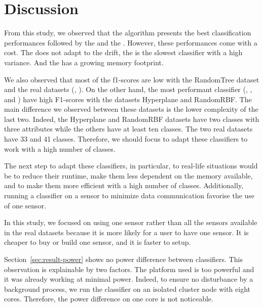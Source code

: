 \section{Discussion}
From this study, we observed that the \hoeffdingtree algorithm presents the
best classification performances followed by the \naivebayes and the
\mondrianforest.  However, these performances come with a cost.  The
\naivebayes does not adapt to the drift, the \mondrianforest is the slowest
classifier with a high variance. And the \hoeffdingtree has a growing memory
footprint.

We also observed that most of the f1-scores are low with the RandomTree dataset and
the real datasets (\banosdataset, \recofitdataset). On the other hand, the most
performant classifier (\mondrianforest, \hoeffdingtree, and \naivebayes) have high
F1-scores with the datasets Hyperplane and RandomRBF. The main difference we
observed between these datasets is the lower complexity of the last two.
Indeed, the Hyperplane and RandomRBF datasets have two classes with three
attributes while the others have at least ten classes. The two real datasets
have 33 and 41 classes. Therefore, we should focus to adapt these classifiers
to work with a high number of classes.

The next step to adapt these classifiers, \mondrianforest in particular, to real-life
situations would be to reduce their runtime, make them less dependent on the
memory available, and to make them more efficient with a high number of
classes. Additionally, running a classifier on a sensor to minimize data
communication favorise the use of one sensor.


In this study, we focused on using one sensor rather than all the sensors
available in the real datasets because it is more likely for a user to have one
sensor. It is cheaper to buy or build one sensor, and it is faster to setup.


Section~\ref{sec:result-power} shows no power difference between classifiers. This
observation is explainable by two factors. The platform used is too powerful
and it was already working at minimal power. Indeed, to ensure no disturbance
by a background process, we run the classifier on an isolated cluster node with
eight cores. Therefore, the power difference on one core is not noticeable.

